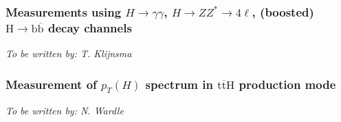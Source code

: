 \newcommand{\bbbar}{\ensuremath{\text{b}\overline{\text{b}}}\xspace}
\newcommand{\Hbb}{\ensuremath{\text{H}\rightarrow\bbbar}\xspace}
\newcommand{\ttbar}{\ensuremath{\text{t}\overline{\text{t}}}\xspace}
\newcommand{\ttH}{\ensuremath{\ttbar\text{H}}\xspace}

\subsubsection{Measurements using $H \to \gamma\gamma$, $H \to ZZ^* \to 4\ell$, (boosted) \Hbb decay channels}
\begin{center}{\it To be written by: T. Klijnsma} \end{center}

\subsubsection{Measurement of $p_{T}(H)$ spectrum  in \ttH production mode}
\begin{center}{\it To be written by: N. Wardle} \end{center}
